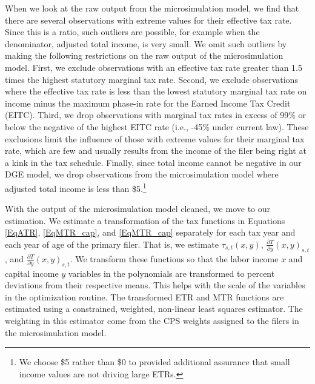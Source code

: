 \documentclass[letterpaper,12pt]{article}
\theoremstyle{definition}
\begin{document}
\begin{spacing}{1.5}
    When we look at the raw output from the microsimulation model, we find that there are several observations with extreme values for their effective tax rate. Since this is a ratio, such outliers are possible, for example when the denominator, adjusted total income, is very small. We omit such outliers by making the following restrictions on the raw output of the microsimulation model. First, we exclude observations with an effective tax rate greater than 1.5 times the highest statutory marginal tax rate.  Second, we exclude observations where the effective tax rate is less than the lowest statutory marginal tax rate on income minus the maximum phase-in rate for the Earned Income Tax Credit (EITC).  Third, we drop observations with marginal tax rates in excess of 99\% or below the negative of the highest EITC rate (i.e., -45\% under current law).  These exclusions limit the influence of those with extreme values for their marginal tax rate, which are few and usually results from the income of the filer being right at a kink in the tax schedule.  Finally, since total income cannot be negative in our DGE model, we drop observations from the microsimulation model where adjusted total income is less than \$5.\footnote{We choose \$5 rather than \$0 to provided additional assurance that small income values are not driving large ETRs.}

    With the output of the microsimulation model cleaned, we move to our estimation. We estimate a transformation of the tax functions in Equations \eqref{EqATR}, \eqref{EqMTR_cap}, and \eqref{EqMTR_cap}  separately for each tax year and each year of age of the primary filer. That is, we estimate $\tau_{s,t}(x,y)$, $\frac{\partial T}{\partial y}\left(x,y\right)_{s,t}$, and $\frac{\partial T}{\partial y}\left(x,y\right)_{s,t}$. We transform these functions so that the labor income $x$ and capital income $y$ variables in the polynomials are transformed to percent deviations from their respective means. This helps with the scale of the variables in the optimization routine. The transformed ETR and MTR functions are estimated using a constrained, weighted, non-linear least squares estimator.  The weighting in this estimator come from the CPS weights assigned to the filers in the microsimulation model.


\end{spacing}
\end{document}

